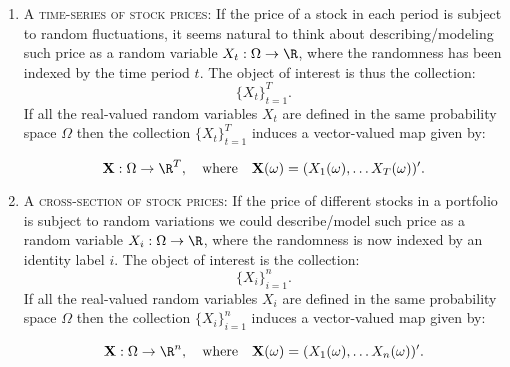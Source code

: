 \documentclass[11pt]{article} %
\begin{document}
\begin{enumerate}
\item {\scshape{A time-series of stock prices}}: If the price of a stock in each period is subject to random fluctuations, it seems natural to think about describing/modeling such price as a random variable $X_t:\Omega \rightarrow \R$, where the randomness has been indexed by the time period $t$. The object of interest is thus the collection:
$$\{X_t\}_{t=1}^{T}.$$
If all the real-valued random variables $X_t$ are defined in the same probability space $\Omega$ then the collection $\{X_t\}_{t=1}^{T}$ induces a vector-valued map given by:

$$\textbf{X}: \Omega \rightarrow \R^{T}, \quad \text{where} \quad \textbf{X}(\omega) = (X_1(\omega), \ldots X_{T}(\omega))'. $$ 







\item {\scshape {A cross-section of stock prices:}} If the price of different stocks in a portfolio is subject to random variations we could describe/model such price as a random variable $X_i:\Omega \rightarrow \R$, where the randomness is now indexed by an identity label $i$. The object of interest is the collection:
$$\{X_i\}_{i=1}^{n}.$$
If all the real-valued random variables $X_i$ are defined in the same probability space $\Omega$ then the collection $\{X_i\}_{i=1}^{n}$ induces a vector-valued map given by:

$$\textbf{X}: \Omega \rightarrow \R^{n}, \quad \text{where} \quad \textbf{X}(\omega) = (X_1(\omega), \ldots X_{n}(\omega))'. $$ 


\end{enumerate}
\end{document}
